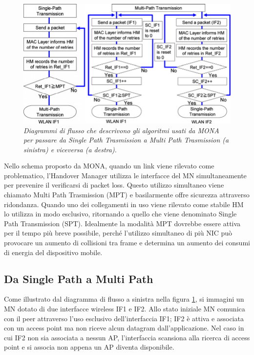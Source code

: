 \documentclass[12pt,a4paper,openright,twoside]{book}
\begin{document}
\begin{figure}[tb]
  \centering
  \includegraphics[width=\textwidth]{img/mona-sp-mp}
  \caption{\em Diagrammi di flusso che descrivono gli algoritmi usati da
    MONA per passare da Single Path Trasmission a Multi Path Trasmission
    (a sinistra) e viceversa (a destra).}
  \label{fig:mona:sp-mp}
\end{figure}

Nello schema proposto da MONA, quando un link viene rilevato come
problematico, l'Handover Manager utilizza le interfacce del MN
simultaneamente per prevenire il verificarsi di packet loss. Questo
utilizzo simultaneo viene chiamato Multi Path Trasmission (MPT) e
basilarmente offre sicurezza attraverso ridondanza. Quando uno dei
collegamenti in uso viene rilevato come stabile HM lo utilizza in modo
esclusivo, ritornando a quello che viene denominato Single Path
Transmission (SPT). Idealmente la modalità MPT dovrebbe essere attiva
per il tempo più breve possibile, perché l'utilizzo simultaneo di più
NIC può provocare un aumento di collisioni tra frame e determina un
aumento dei consumi di energia del dispositivo mobile.

\subsection{Da Single Path a Multi Path}

Come illustrato dal diagramma di flusso a sinistra nella figura
\ref{fig:mona:sp-mp}, si immagini un MN dotato di due interfacce
wireless IF1 e IF2. Allo stato iniziale MN comunica con il peer
attraverso l'uso esclusivo dell'interfaccia IF1; IF2 è attiva e
associata con un access point ma non riceve alcun datagram
dall'applicazione. Nel caso in cui IF2 non sia associata a nessun AP,
l'interfaccia scansiona alla ricerca di access point e si associa non
appena un AP diventa disponibile.
\end{document}
